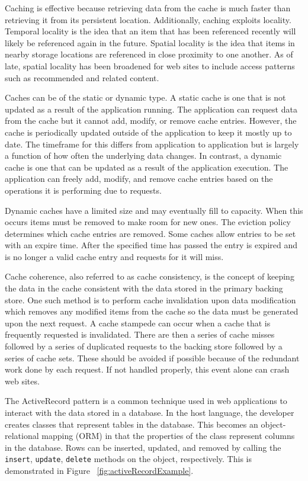 \documentclass[12pt]{ucthesis}
\begin{document}
Caching is effective because retrieving data from the cache is much faster than retrieving it from its persistent location.
Additionally, caching exploits locality.
Temporal locality is the idea that an item that has been referenced recently will likely be referenced again in the future.
Spatial locality is the idea that items in nearby storage locations are referenced in close proximity to one another.
As of late, spatial locality has been broadened for web sites to include access patterns such as recommended and related content.

Caches can be of the static or dynamic type.
A static cache is one that is not updated as a result of the application running.
The application can request data from the cache but it cannot add, modify, or remove cache entries.
However, the cache is periodically updated outside of the application to keep it mostly up to date.
The timeframe for this differs from application to application but is largely a function of how often the underlying data changes.
In contrast, a dynamic cache is one that can be updated as a result of the application execution.
The application can freely add, modify, and remove cache entries based on the operations it is performing due to requests.

Dynamic caches have a limited size and may eventually fill to capacity.
When this occurs items must be removed to make room for new ones.
The eviction policy determines which cache entries are removed.
Some caches allow entries to be set with an expire time.
After the specified time has passed the entry is expired and is no longer a valid cache entry and requests for it will miss.

Cache coherence, also referred to as cache consistency, is the concept of keeping the data in the cache consistent with the data stored in the primary backing store.
One such method is to perform cache invalidation upon data modification which removes any modified items from the cache so the data must be generated upon the next request.
A cache stampede can occur when a cache that is frequently requested is invalidated.
There are then a series of cache misses followed by a series of duplicated requests to the backing store followed by a series of cache sets.
These should be avoided if possible because of the redundant work done by each request.
If not handled properly, this event alone can crash web sites.

The ActiveRecord pattern is a common technique used in web applications to interact with the data stored in a database.
In the host language, the developer creates classes that represent tables in the database.
This becomes an object-relational mapping (ORM) in that the properties of the class represent columns in the database.
Rows can be inserted, updated, and removed by calling the {\tt insert}, {\tt update}, {\tt delete} methods on the object, respectively.
This is demonstrated in Figure ~\ref{fig:activeRecordExample}.
\end{document}
